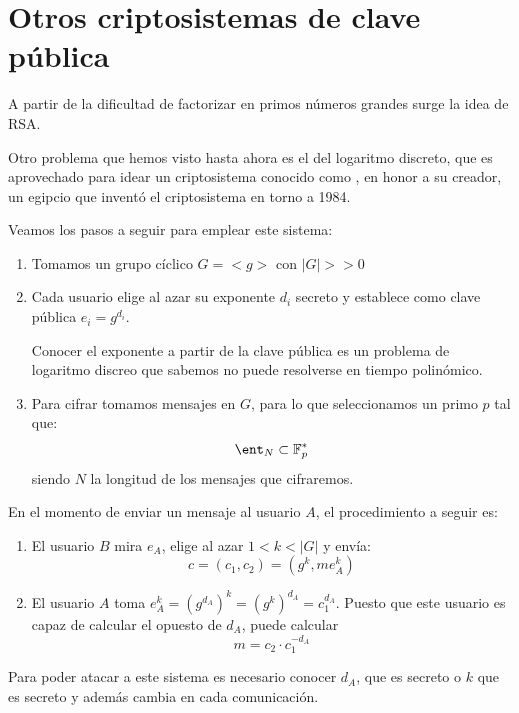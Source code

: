 \section{Otros criptosistemas de clave pública}

A partir de la dificultad de factorizar en primos números grandes surge la idea de RSA.

Otro problema que hemos visto hasta ahora es el del logaritmo discreto, que es aprovechado para idear un criptosistema conocido como , en honor a su creador, un egipcio que inventó el criptosistema en torno a 1984.

Veamos los pasos a seguir para emplear este sistema:
\begin{enumerate}
\item Tomamos un grupo cíclico $G=<g>$ con $|G| >> 0$

\item Cada usuario elige al azar su exponente $d_i$ secreto y establece como clave pública $e_i=g^{d_i}$.

Conocer el exponente a partir de la clave pública es un problema de logaritmo discreo que sabemos no puede resolverse en tiempo polinómico.

\item Para cifrar tomamos mensajes en $G$, para lo que seleccionamos un primo $p$ tal que:
\[\ent_N \subset \mathbb{F}_p^*\]
siendo $N$ la longitud de los mensajes que cifraremos.
\end{enumerate}

En el momento de enviar un mensaje al usuario $A$, el procedimiento a seguir es:
\begin{enumerate}
\item El usuario $B$ mira $e_A$, elige al azar $1<k<|G|$ y envía:
\[c=(c_1,c_2)=(g^k,me_A^k)\]

\item El usuario $A$ toma $e_A^k = (g^{d_A})^k = (g^k)^{d_A}=c_1^{d_A}$. Puesto que  este usuario es capaz de calcular el opuesto de $d_A$, puede calcular
\[m = c_2\cdot c_1^{-d_A}\]
\end{enumerate}

Para poder atacar a este sistema es necesario conocer $d_A$, que es secreto o $k$ que es secreto y además cambia en cada comunicación.